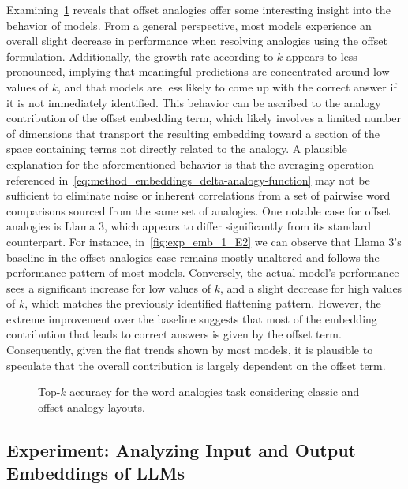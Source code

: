 Examining~\cref{fig:exp_emb_1_E} reveals that offset analogies offer some interesting insight into the behavior of models.
From a general perspective, most models experience an overall slight decrease in performance when resolving analogies using the offset formulation.
Additionally, the growth rate according to $k$ appears to less pronounced, implying that meaningful predictions are concentrated around low values of $k$, and that models are less likely to come up with the correct answer if it is not immediately identified.
This behavior can be ascribed to the analogy contribution of the offset embedding term, which likely involves a limited number of dimensions that transport the resulting embedding toward a section of the space containing terms not directly related to the analogy.
A plausible explanation for the aforementioned behavior is that the averaging operation referenced in~\cref{eq:method_embeddings_delta-analogy-function} may not be sufficient to eliminate noise or inherent correlations from a set of pairwise word comparisons sourced from the same set of analogies.
One notable case for offset analogies is Llama 3, which appears to differ significantly from its standard counterpart.
For instance, in~\cref{fig:exp_emb_1_E2} we can observe that Llama 3's baseline in the offset analogies case remains mostly unaltered and follows the performance pattern of most models.
Conversely, the actual model's performance sees a significant increase for low values of $k$, and a slight decrease for high values of $k$, which matches the previously identified flattening pattern.
However, the extreme improvement over the baseline suggests that most of the embedding contribution that leads to correct answers is given by the offset term.
Consequently, given the flat trends shown by most models, it is plausible to speculate that the overall contribution is largely dependent on the offset term.

\begin{figure}[t!]
    \centering
    \caption{Top-$k$ accuracy for the word analogies task considering classic and offset analogy layouts.}
    \label{fig:exp_emb_1_E}
\end{figure}

\subsection[Experiment: Analyzing Input and Output Embeddings of LLMs]{Experiment: Analyzing Input and Output \texorpdfstring{\linebreak}{} Embeddings of LLMs}\label{ssec:exp_emb_exp2}


